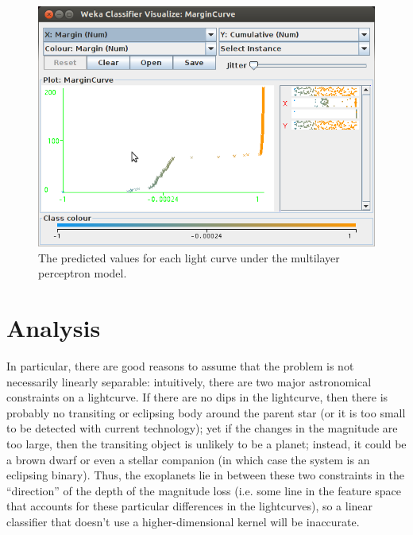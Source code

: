 \documentclass{amsart}
\begin{document}
	\begin{figure}
	\centering
	\label{multilayer}
	\includegraphics[width=6in]{multilayer_perceptron}
	\caption{The predicted values for each light curve under the multilayer perceptron model.}
	\end{figure}
	

\section{Analysis}


In particular, there are good reasons to assume that the problem is not necessarily linearly separable: intuitively, there are two major astronomical constraints on a lightcurve. If there are no dips in the lightcurve, then there is probably no transiting or eclipsing body around the parent star (or it is too small to be detected with current technology); yet if the changes in the magnitude are too large, then the transiting object is unlikely to be a planet; instead, it could be a brown dwarf or even a stellar companion (in which case the system is an eclipsing binary). Thus, the exoplanets lie in between these two constraints in the ``direction'' of the depth of the magnitude loss (i.e. some line in the feature space that accounts for these particular differences in the lightcurves), so a linear classifier that doesn't use a higher-dimensional kernel will be inaccurate.
\end{document}
